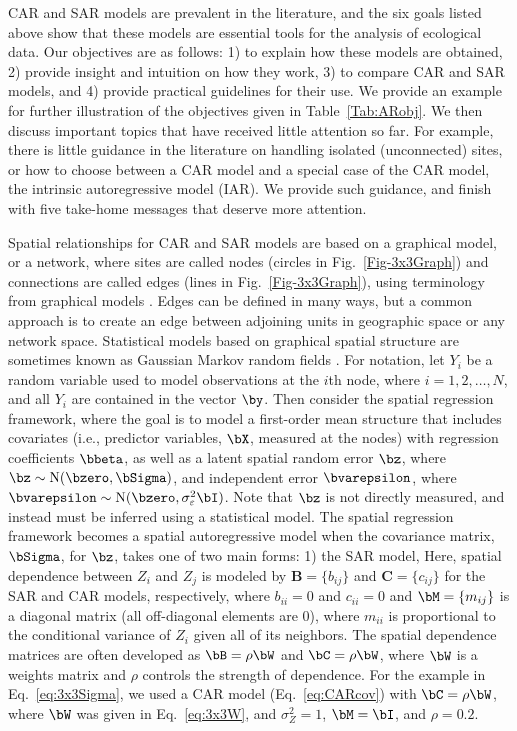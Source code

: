 CAR and SAR models are prevalent in the literature, and the six goals listed above show that these models are essential tools for the analysis of ecological data.  Our objectives are as follows: 1) to explain how these models are obtained, 2) provide insight and intuition on how they work, 3) to compare CAR and SAR models, and 4) provide practical guidelines for their use. We provide an example for further illustration of the objectives given in Table~\ref{Tab:ARobj}. We then discuss important topics that have received little attention so far.  For example, there is little guidance in the literature on handling isolated (unconnected) sites, or how to choose between a CAR model and a special case of the CAR model, the intrinsic autoregressive model (IAR).  We provide such guidance, and finish with five take-home messages that deserve more attention.
 
Spatial relationships for CAR and SAR models are based on a graphical model, or a network, where sites are called nodes (circles in Fig.~\ref{Fig-3x3Graph}) and connections are called edges (lines in Fig.~\ref{Fig-3x3Graph}), using terminology from graphical models \citep[e.g.,][]{Laur:grap:1996, Whit:grap:2009}. Edges can be defined in many ways, but a common approach is to create an edge between adjoining units in geographic space or any network space. Statistical models based on graphical spatial structure are sometimes known as Gaussian Markov random fields \citep[e.g.,][]{Rue:Held:Gaus:2005}.  For notation, let $Y_i$ be a random variable used to model observations at the $i$th node, where $i = 1, 2, \dots, N$, and all $Y_i$ are contained in the vector $\by$. Then consider the spatial regression framework, 
where the goal is to model a first-order mean structure that includes covariates (i.e., predictor variables, $\bX$, measured at the nodes) with regression coefficients $\bbeta$, as well as a latent spatial random error $\bz$, where $\bz \sim \textrm{N}(\bzero,\bSigma)$, and independent error $\bvarepsilon$, where $\bvarepsilon \sim \textrm{N}(\bzero,\sigma^2_\varepsilon \bI)$. Note that $\bz$ is not directly measured, and instead must be inferred using a statistical model. The spatial regression framework becomes a spatial autoregressive model when the covariance matrix, $\bSigma$, for $\bz$, takes one of two main forms: 1) the SAR model,
Here, spatial dependence between $Z_i$ and $Z_j$ is modeled by $\mathbf{B} = \{b_{ij}\}$ and $\mathbf{C} = \{c_{ij}\}$ for the SAR and CAR models, respectively, where $b_{ii} = 0$ and $c_{ii} = 0$ and $\bM = \{m_{ij}\}$ is a diagonal matrix (all off-diagonal elements are 0), where $m_{ii}$ is proportional to the conditional variance of $Z_i$ given all of its neighbors. The spatial dependence matrices are often developed as $\bB = \rho\bW$ and $\bC = \rho\bW$, where $\bW$ is a weights matrix and $\rho$ controls the strength of dependence.  For the example in Eq.~\ref{eq:3x3Sigma}, we used a CAR model (Eq.~\ref{eq:CARcov}) with $\bC = \rho\bW$, where $\bW$ was given in Eq.~\ref{eq:3x3W}, and $\sigma^2_Z =1$, $\bM = \bI$, and $\rho = 0.2$.

